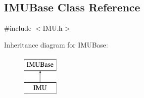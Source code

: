 \hypertarget{class_i_m_u_base}{
\subsection{IMUBase Class Reference}
\label{class_i_m_u_base}
}


{\ttfamily \#include $<$IMU.h$>$}

Inheritance diagram for IMUBase:\begin{figure}[H]
\begin{center}
\leavevmode
\includegraphics[height=2.000000cm]{class_i_m_u_base}
\end{center}
\end{figure}
